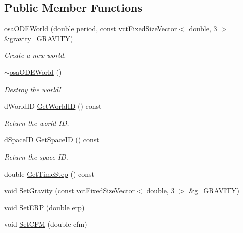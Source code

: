 \subsection*{Public Member Functions}
\begin{DoxyCompactItemize}
\item 
\hyperlink{classosa_o_d_e_world_a2d8285b050f2ab13a18813579ba5f540}{osa\+O\+D\+E\+World} (double period, const \hyperlink{classvct_fixed_size_vector}{vct\+Fixed\+Size\+Vector}$<$ double, 3 $>$ \&gravity=\hyperlink{classosa_o_d_e_world_ae1d291977a1d6305cea26a6bd87fa320}{G\+R\+A\+V\+I\+T\+Y})
\begin{DoxyCompactList}\small\item\em Create a new world. \end{DoxyCompactList}\item 
\hyperlink{classosa_o_d_e_world_a671448e0f6dd7cc68f350d8757547e50}{$\sim$osa\+O\+D\+E\+World} ()
\begin{DoxyCompactList}\small\item\em Destroy the world! \end{DoxyCompactList}\item 
d\+World\+I\+D \hyperlink{classosa_o_d_e_world_a872dbc2ae690fed8bf9a5b9afbf78ca4}{Get\+World\+I\+D} () const 
\begin{DoxyCompactList}\small\item\em Return the world I\+D. \end{DoxyCompactList}\item 
d\+Space\+I\+D \hyperlink{classosa_o_d_e_world_a0e95c5907ccc33463f2633c475d0a5a4}{Get\+Space\+I\+D} () const 
\begin{DoxyCompactList}\small\item\em Return the space I\+D. \end{DoxyCompactList}\item 
double \hyperlink{classosa_o_d_e_world_a33a419109ea4b150409425beb7b2a876}{Get\+Time\+Step} () const 
\item 
void \hyperlink{classosa_o_d_e_world_ac1992945835ed570eac30ffa061c338a}{Set\+Gravity} (const \hyperlink{classvct_fixed_size_vector}{vct\+Fixed\+Size\+Vector}$<$ double, 3 $>$ \&g=\hyperlink{classosa_o_d_e_world_ae1d291977a1d6305cea26a6bd87fa320}{G\+R\+A\+V\+I\+T\+Y})
\item 
void \hyperlink{classosa_o_d_e_world_adde150945d4cdb4ba1ac5175e4b0a077}{Set\+E\+R\+P} (double erp)
\item 
void \hyperlink{classosa_o_d_e_world_ad128462aa9d1fcb9fd73a8be25fa1452}{Set\+C\+F\+M} (double cfm)

\end{DoxyCompactItemize}
